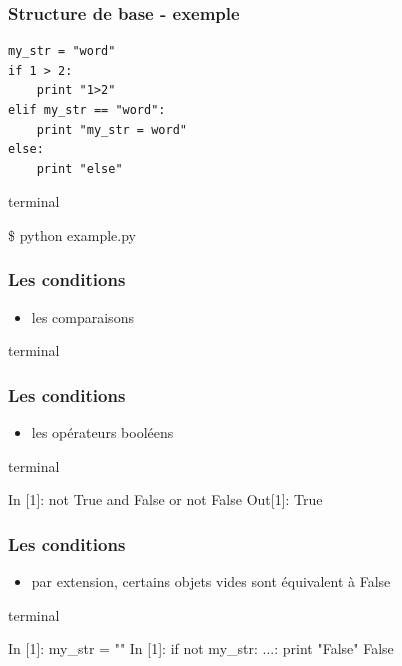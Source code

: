 \begin{frame}[fragile]
  \frametitle{Structure de base - exemple}
  \begin{lstlisting}
my_str = "word"
if 1 > 2:
    print "1>2"
elif my_str == "word":
    print "my_str = word"
else:
    print "else"
  \end{lstlisting}

  \begin{beamercolorbox}{terminal}
  \begin{semiverbatim}
 \$ python example.py
  \end{semiverbatim}
  \end{beamercolorbox}

\end{frame}

\begin{frame}[fragile]
  \frametitle{Les conditions}
  \begin{itemize}
    \item les comparaisons
  \end{itemize}
  \begin{beamercolorbox}{terminal}
  \begin{semiverbatim}

\end{semiverbatim}
    \end{beamercolorbox}
\end{frame}

\begin{frame}[fragile]
  \frametitle{Les conditions}
  \begin{itemize}
    \item les opérateurs booléens
  \end{itemize}
  \begin{beamercolorbox}{terminal}
  \begin{semiverbatim}
 In [1]: not True and False or not False
 Out[1]: True\end{semiverbatim}
  \end{beamercolorbox}
\end{frame}

\begin{frame}[fragile]
  \frametitle{Les conditions}
  \begin{itemize}
    \item par extension, certains objets vides sont équivalent à False
  \end{itemize}
  \begin{beamercolorbox}{terminal}
  \begin{semiverbatim}
 In [1]: my_str = ""
 In [1]: if not my_str:
    ...:     print "False"
 False\end{semiverbatim}
  \end{beamercolorbox}
\end{frame}

